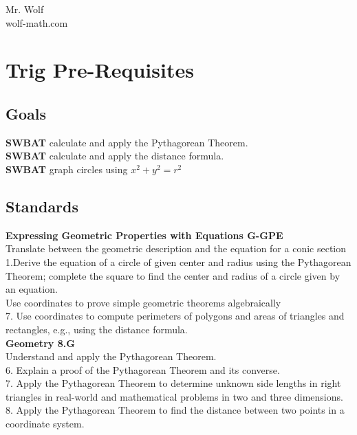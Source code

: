 \documentclass[12pt]{article}
\begin{document}
Mr. Wolf  \\ wolf-math.com

\section*{Trig Pre-Requisites}

\subsection*{Goals}

\textbf{SWBAT} calculate and apply the Pythagorean Theorem.\\

\textbf{SWBAT} calculate and apply the distance formula.\\

\textbf{SWBAT} graph circles using $x^2+y^2=r^2$\\

\subsection*{Standards}

\textbf{Expressing Geometric Properties with Equations \hfill	G-GPE}\\

Translate between the geometric description and the equation for a
conic section\\

1.Derive the equation of a circle of given center and radius using the
Pythagorean Theorem; complete the square to find the center and
radius of a circle given by an equation.\\

Use coordinates to prove simple geometric theorems algebraically\\

7.	 Use coordinates to compute perimeters of polygons and areas of
triangles and rectangles, e.g., using the distance formula. \\

\textbf{Geometry \hfill 8.G}\\

Understand and apply the Pythagorean Theorem.\\

6.	 Explain a proof of the Pythagorean Theorem and its converse.\\
7.	 Apply the Pythagorean Theorem to determine unknown side lengths
in right triangles in real-world and mathematical problems in two and
three dimensions.\\
8.	 Apply the Pythagorean Theorem to find the distance between two
points in a coordinate system.\\
\end{document}
